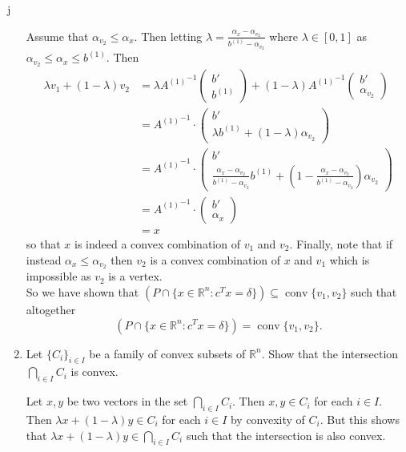 j\documentclass[11pt]{article}
\DeclareMathOperator{\conv}{conv}
\newcommand{\setR}{\mathbb{R}}
\renewcommand{\leq}{\leqslant}
\begin{document}
\begin{enumerate}[1)]
\begin{solution}
Assume that $\alpha_{v_2} \leq \alpha_x$. Then letting $\lambda = \frac{\alpha_x - \alpha_{v_2}}{b^{(1)}- \alpha_{v_2}}$ where $\lambda \in [0,1]$ as $\alpha_{v_2} \leq \alpha_x \leq b^{(1)}$. Then 
\begin{align*}
\lambda v_1 + (1- \lambda)v_2 & = \lambda {A^{(1)}}^{-1}\begin{pmatrix} b' \\ b^{(1)} \end{pmatrix} + (1 - \lambda) {A^{(1)}}^{-1}\begin{pmatrix} b' \\ \alpha_{v_2} \end{pmatrix} \\
& = {A^{(1)}}^{-1} \cdot \begin{pmatrix} b' \\ \lambda b^{(1)}  + (1-\lambda) \alpha_{v_2}\end{pmatrix} \\
& = {A^{(1)}}^{-1} \cdot \begin{pmatrix} b' \\ \frac{\alpha_x - \alpha_{v_2}}{b^{(1)}- \alpha_{v_2}} b^{(1)}  + \left(1-\frac{\alpha_x - \alpha_{v_2}}{b^{(1)}- \alpha_{v_2}}\right) \alpha_{v_2}\end{pmatrix} \\
& = {A^{(1)}}^{-1} \cdot \begin{pmatrix} b' \\ \alpha_x \end{pmatrix} \\
& = x
\end{align*}
so that $x$ is indeed a convex combination of $v_1$ and $v_2$. Finally, note that if instead $\alpha_{x} \leq \alpha_{v_2}$ then $v_2$ is a convex combination of $x$ and $v_1$ which is impossible as $v_2$ is a vertex. 
\\


So we have shown that $(P \cap \{x \in \setR^n: c^Tx = \delta\}) \subseteq \conv\{v_1, v_2\}$ such that altogether $$(P \cap \{x \in \setR^n: c^Tx = \delta\}) = \conv\{v_1, v_2\}.$$





\end{solution}

\item Let $\{C_i\}_{i\in I}$ be a family of convex subsets of $\setR^n$.
  Show that the intersection $\bigcap_{i\in I} C_i$ is convex.
  
  
  \begin{solution}
  Let $x, y$ be two vectors in the set $\bigcap_{i \in I} C_i$. Then $x, y \in C_i$ for each $i \in I$. Then $\lambda x + (1-\lambda)y \in C_i$ for each $i \in I$ by convexity of $C_i$. But this shows that $\lambda x + (1-\lambda)y \in \bigcap_{i \in I}C_i$ such that the intersection is also convex.
  

\end{solution}
\end{enumerate}
\end{document}
